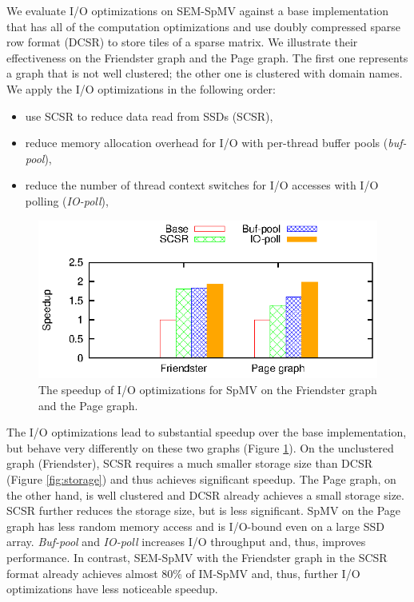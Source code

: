 We evaluate I/O optimizations on SEM-SpMV against a base implementation that
has all of the computation optimizations and use doubly compressed sparse row
format (DCSR) to store tiles of a sparse matrix. We illustrate their
effectiveness on the Friendster graph and the Page graph. The first one
represents a graph that is not well clustered; the other one is clustered with
domain names. We apply the I/O optimizations in the following order:
\begin{itemize} \itemsep1pt \parskip0pt 
	\item use SCSR to reduce data read from SSDs (SCSR),
	\item reduce memory allocation overhead for I/O with per-thread buffer
		pools (\textit{buf-pool}),
	\item reduce the number of thread context switches for I/O accesses with I/O
		polling (\textit{IO-poll}),
\end{itemize}

\begin{figure}
	\begin{center}
		\footnotesize
		\includegraphics[scale=1]{SpMM_figs/io_opts.eps}
		\caption{The speedup of I/O optimizations for SpMV on the Friendster
		graph and the Page graph.}
		\label{perf:spmm_opt_io}
	\end{center}
\end{figure}

The I/O optimizations lead to substantial speedup over the base implementation,
but behave very differently on these two graphs (Figure \ref{perf:spmm_opt_io}).
On the unclustered graph (Friendster), SCSR requires a much smaller storage size
than DCSR (Figure \ref{fig:storage}) and thus achieves significant
speedup. The Page graph, on the other hand, is well clustered and DCSR already
achieves a small storage size. SCSR further reduces the storage size, but is
less significant. SpMV on the Page graph has less random memory access and is
I/O-bound even on a large SSD array. \textit{Buf-pool} and \textit{IO-poll}
increases I/O throughput and, thus, improves performance. In contrast, SEM-SpMV
with the Friendster graph in the SCSR format already achieves almost 80\% of
IM-SpMV and, thus, further I/O optimizations have less noticeable speedup.

